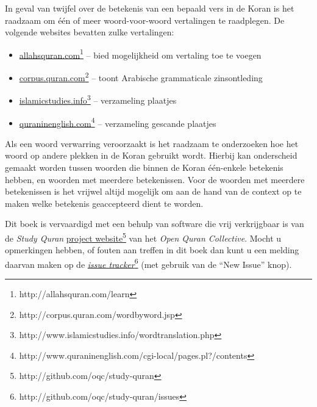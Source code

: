 \noindent In geval van twijfel over de betekenis van een bepaald vers in de Koran is het raadzaam om één of meer woord-voor-woord vertalingen te raadplegen.  De volgende websites bevatten zulke vertalingen:
\begin{itemize}
  \item \href{http://allahsquran.com/learn}{allahsquran.com}\footnote{\textsf{http://allahsquran.com/learn}} -- bied mogelijkheid om vertaling toe te voegen
  \item \href{http://corpus.quran.com/wordbyword.jsp}{corpus.quran.com}\footnote{\textsf{http://corpus.quran.com/wordbyword.jsp}} -- toont Arabische grammaticale zinsontleding
  \item \href{http://www.islamicstudies.info/wordtranslation.php}{islamicstudies.info}\footnote{\textsf{http://www.islamicstudies.info/wordtranslation.php}} -- verzameling plaatjes
  \item \href{http://www.quraninenglish.com/cgi-local/pages.pl?/contents}{quraninenglish.com}\footnote{\textsf{http://www.quraninenglish.com/cgi-local/pages.pl?/contents}} -- verzameling gescande plaatjes
\end{itemize}
Als een woord verwarring veroorzaakt is het raadzaam te onderzoeken hoe het woord op andere plekken in de Koran gebruikt wordt.  Hierbij kan onderscheid gemaakt worden tussen woorden die binnen de Koran één-enkele betekenis hebben, en woorden met meerdere betekenissen.  Voor de woorden met meerdere betekenissen is het vrijwel altijd mogelijk om aan de hand van de context op te maken welke betekenis geaccepteerd dient te worden.
\vspace{0.3cm}

\noindent Dit boek is vervaardigd met een behulp van software die vrij verkrijgbaar is van de \emph{Study Quran} \href{http://github.com/oqc/study-quran}{project website}\footnote{\textsf{http://github.com/oqc/study-quran}} van het \emph{Open Quran Collective}.  Mocht u opmerkingen hebben, of fouten aan treffen in dit boek dan kunt u een melding daarvan maken op de \href{http://github.com/oqc/study-quran/issues}{\emph{issue tracker}}\footnote{\textsf{http://github.com/oqc/study-quran/issues}} (met gebruik van de ``New Issue'' knop).




